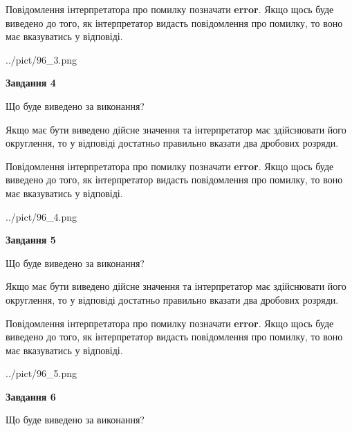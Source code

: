 \documentclass[12pt, ukrainian]{article}
\begin{document}
{\begin {Large}
Повідомлення інтерпретатора про помилку позначати \textbf{error}.
Якщо щось буде виведено до того, як інтерпретатор видасть повідомлення про помилку, 
то воно має вказуватись у відповіді. \par

\begin{center}
	{../pict/96_3.png}
\end{center}
\newpage

{\begin {center}\textbf{Завдання 4}\end {center}}\par
Що буде виведено за виконання? \par

Якщо має бути виведено дійсне значення та інтерпретатор має здійснювати його округлення, 
то у відповіді достатньо правильно вказати два дробових розряди.

Повідомлення інтерпретатора про помилку позначати \textbf{error}.
Якщо щось буде виведено до того, як інтерпретатор видасть повідомлення про помилку, 
то воно має вказуватись у відповіді. \par

\begin{center}
	{../pict/96_4.png}
\end{center}
\newpage

{\begin {center}\textbf{Завдання 5}\end {center}}\par
Що буде виведено за виконання? \par

Якщо має бути виведено дійсне значення та інтерпретатор має здійснювати його округлення, 
то у відповіді достатньо правильно вказати два дробових розряди.

Повідомлення інтерпретатора про помилку позначати \textbf{error}.
Якщо щось буде виведено до того, як інтерпретатор видасть повідомлення про помилку, 
то воно має вказуватись у відповіді. \par

\begin{center}
	{../pict/96_5.png}
\end{center}
\newpage

{\begin {center}\textbf{Завдання 6}\end {center}}\par
Що буде виведено за виконання? \par


\end{Large}}
\end{document}
